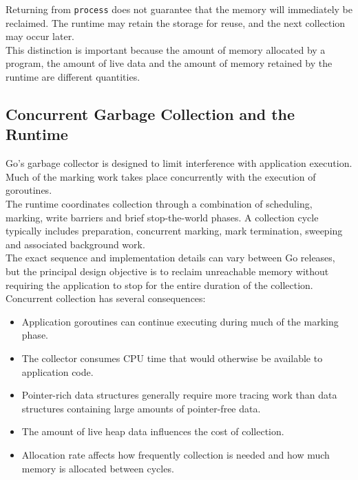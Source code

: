 Returning from \texttt{process} does not guarantee that the memory will immediately be reclaimed. The runtime may retain the storage for reuse, and the next collection may occur later.\\

This distinction is important because the amount of memory allocated by a program, the amount of live data and the amount of memory retained by the runtime are different quantities.\\

\subsection{Concurrent Garbage Collection and the Runtime}

Go's garbage collector is designed to limit interference with application execution. Much of the marking work takes place concurrently with the execution of goroutines.\\

The runtime coordinates collection through a combination of scheduling, marking, write barriers and brief stop-the-world phases. A collection cycle typically includes preparation, concurrent marking, mark termination, sweeping and associated background work.\\

The exact sequence and implementation details can vary between Go releases, but the principal design objective is to reclaim unreachable memory without requiring the application to stop for the entire duration of the collection.\\

Concurrent collection has several consequences:

\begin{itemize}
    \item Application goroutines can continue executing during much of the marking phase.
    \item The collector consumes CPU time that would otherwise be available to application code.
    \item Pointer-rich data structures generally require more tracing work than data structures containing large amounts of pointer-free data.
    \item The amount of live heap data influences the cost of collection.
    \item Allocation rate affects how frequently collection is needed and how much memory is allocated between cycles.
\end{itemize}

